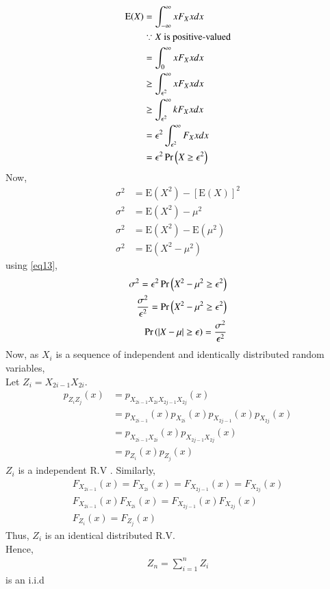 \documentclass[journal,12pt,Twocolumn]{IEEEtran}
\theoremstyle{remark}
\begin{document}
\begin{align}
\text{E}(X)&=\int_{-\infty}^\infty xF_X{x}dx \\
&\because X \text{ is positive-valued} \\
&=\int_{0}^\infty xF_X{x}dx \\ 
&\geq \int_{\epsilon^2}^\infty xF_X{x}dx \\ 
&\geq \int_{\epsilon^2}^\infty kF_X{x}dx \\
&=\epsilon^2\int_{\epsilon^2}^\infty F_X{x}dx \\
\label{eq13}&=\epsilon^2\Pr\left(X\geq \epsilon^2\right)
\end{align}
Now,
\begin{align}
\sigma^2 &= \text{E}(X^2) - [\text{E}(X)]^2 \\
\sigma^2 &= \text{E}(X^2) - \mu^2 \\
\sigma^2 &= \text{E}(X^2) - \text{E}(\mu^2) \\
\sigma^2 &= \text{E}(X^2-\mu^2)
\end{align}
using \eqref{eq13},
\begin{align}
\sigma^2 = \epsilon^2\Pr\left(X^2-\mu^2\geq \epsilon^2\right) \\
\frac{\sigma^2}{\epsilon^2} = \Pr\left(X^2-\mu^2\geq \epsilon^2\right) \\
\Pr\left(|X-\mu|\geq \epsilon\right) = \frac{\sigma^2}{\epsilon^2} 
\end{align}
Now, as $X_i$ is a sequence of independent and identically distributed random variables, \\
Let $Z_i = X_{2i-1}X_{2i}$. \\ 
\begin{align}
p_{Z_iZ_j}(x)&=p_{X_{2i-1}X_{2i}X_{2j-1}X_{2j}}(x) \\ 
&= p_{X_{2i-1}}(x)p_{X_{2i}}(x)p_{X_{2j-1}}(x)p_{X_{2j}}(x) \\
&= p_{X_{2i-1}X_{2i}}(x)p_{X_{2j-1}X_{2j}}(x) \\
&= p_{Z_i}(x)p_{Z_j}(x)
\end{align}
$Z_i$ is a independent R.V . Similarly,
\begin{align}
F_{X_{2i-1}}(x) = F_{X_{2i}}(x) = F_{X_{2j-1}}(x) = F_{X_{2j}}(x) \\
F_{X_{2i-1}}(x)F_{X_{2i}}(x) = F_{X_{2j-1}}(x)F_{X_{2j}}(x) \\
F_{Z_i}(x) = F_{Z_j}(x)
\end{align}
Thus, $Z_i$ is an identical distributed R.V. \\
Hence,
\begin{align} Z_n=\sum_{i=1}^{n}Z_i 
\end{align} is an i.i.d 
\end{document}
